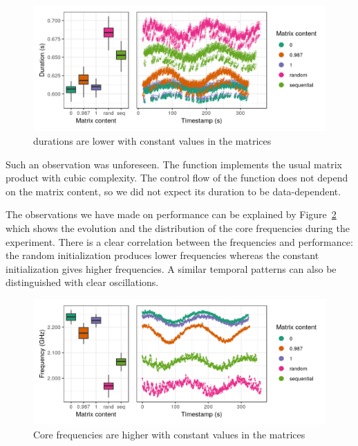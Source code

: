         \begin{figure}[htbp]
            \centering
            \includegraphics[width=\linewidth]{img/experiment/bit-flips/generation_method_perf.png}
            \caption{\label{fig:exp:bit-flips:method-perf}
            \dgemm durations are lower with constant values in the matrices}
        \end{figure}

        Such an observation was unforeseen. The function \dgemm implements the usual matrix product with cubic
        complexity. The control flow of the function does not depend on the matrix content, so we did not expect its
        duration to be data-dependent.

        The observations we have made on \dgemm performance can be explained by
        Figure~\ref{fig:exp:bit-flips:method-freq} which shows the evolution and the distribution of the core
        frequencies during the experiment. There is a clear correlation between the frequencies and \dgemm
        performance: the random initialization produces lower frequencies whereas the constant initialization gives
        higher frequencies. A similar temporal patterns can also be distinguished with clear oscillations.

        \begin{figure}[htbp]
            \centering
            \includegraphics[width=\linewidth]{img/experiment/bit-flips/generation_method_freq.png}
            \caption{\label{fig:exp:bit-flips:method-freq}
            Core frequencies are higher with constant values in the matrices}
        \end{figure}

